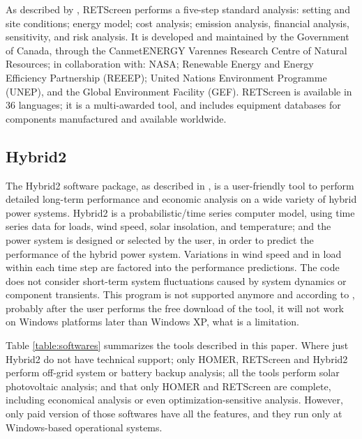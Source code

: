 \documentclass[journal]{IEEEtran}
\begin{document}
As described by \cite{Pradhan}, RETScreen performs a five-step standard analysis: setting and site conditions; energy model; cost analysis; emission analysis, financial analysis, sensitivity, and risk analysis. It is developed and maintained by the Government of Canada, through the CanmetENERGY Varennes Research Centre of Natural Resources; in collaboration with: NASA; Renewable Energy and Energy Efficiency Partnership (REEEP); United Nations Environment Programme (UNEP), and the Global Environment Facility (GEF). RETScreen is available in 36 languages; it is a multi-awarded tool, and includes equipment databases for components manufactured and available worldwide.

\subsection{Hybrid2}
The Hybrid2 software package, as described in \cite{Mills}, is a user-friendly tool to perform detailed long-term performance and economic analysis on a wide variety of hybrid power systems. Hybrid2 is a probabilistic/time series computer model, using time series data for loads, wind speed, solar insolation, and temperature; and the power system is designed or selected by the user, in order to predict the performance of the hybrid power system. Variations in wind speed and in load within each time step are factored into the performance predictions. The code does not consider short-term system fluctuations caused by system dynamics or component transients. This program is not supported anymore and according to \cite{UMASS}, probably after the user performs the free download of the tool, it will not work on Windows platforms later than Windows XP, what is a limitation.

Table \ref{table:softwares} summarizes the tools described in this paper.  Where just Hybrid2 do not have technical support; only HOMER, RETScreen and Hybrid2 perform off-grid system or battery backup analysis; all the tools perform solar photovoltaic analysis; and that only HOMER and RETScreen are complete, including economical analysis or even optimization-sensitive analysis. However, only paid version of those softwares have all the features, and they run only at Windows-based operational systems.
\end{document}
